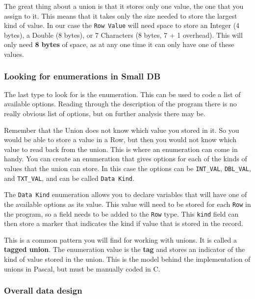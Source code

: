 The great thing about a union is that it stores only one value, the one that you assign to it. This means that it takes only the size needed to store the largest kind of value. In our case the \texttt{Row Value} will need space to store an Integer (4 bytes), a Double (8 bytes), or 7 Characters (8 bytes, 7 + 1 overhead). This will only need \textbf{8 bytes} of space, as at any one time it can only have one of these values. 


\subsubsection{Looking for enumerations in Small DB} %
\label{ssub:looking_for_enumerations_in_small_db}

The last type to look for is the enumeration. This can be used to code a list of available options. Reading through the description of the program there is no really obvious list of options, but on further analysis there may be.

Remember that the Union does not know which value you stored in it. So you would be able to store a value in a Row, but then you would not know which value to read back from the union. This is where an enumeration can come in handy. You can create an enumeration that gives options for each of the kinds of values that the union can store. In this case the options can be \texttt{INT\_VAL}, \texttt{DBL\_VAL}, and \texttt{TXT\_VAL}, and can be called \texttt{Data Kind}.

The \texttt{Data Kind} enumeration allows you to declare variables that will have one of the available options as its value. This value will need to be stored for each \texttt{Row} in the program, so a field needs to be added to the \texttt{Row} type. This \texttt{kind} field can then store a marker that indicates the kind if value that is stored in the record.

This is a common pattern you will find for working with unions. It is called a \textbf{tagged union}. The enumeration value is the \textbf{tag} and stores an indicator of the kind of value stored in the union. This is the model behind the implementation of unions in Pascal, but must be manually coded in C.


\subsubsection{Overall data design} %
\label{ssub:overall_data_design}

